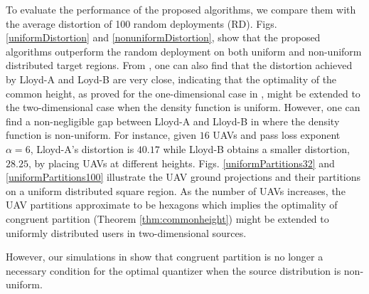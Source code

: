 \documentclass[12pt,onecolumn,final,letterpaper]{IEEEtran}
\newif\ifarxiv\arxivfalse
\begin{document}
To evaluate the performance of the proposed algorithms, we compare them with the average distortion of 100 random
deployments (RD).  Figs. \ref{uniformDistortion} and \ref{nonuniformDistortion}, show that the proposed algorithms
outperform the random deployment on both uniform and non-uniform distributed target regions.  From
, one can also find that the distortion achieved by Lloyd-A and Loyd-B are very close,
indicating that the optimality of the common height, as proved for the one-dimensional case in ,
might be extended to the two-dimensional case when the density function is uniform. However, one can find a non-negligible
gap between Lloyd-A and Lloyd-B in  where the density function is non-uniform. For
instance, given $16$ UAVs and pass loss exponent $\alpha=6$, Lloyd-A's distortion is $40.17$ while Lloyd-B obtains a smaller
distortion, $28.25$, by placing UAVs at different heights.  
%
Figs. \ref{uniformPartitions32} and
\ref{uniformPartitions100} illustrate the UAV ground projections and their partitions on a uniform distributed
square region. As the number of UAVs increases, the UAV partitions approximate to be hexagons which implies the optimality of congruent partition (Theorem \ref{thm:commonheight}) might be extended to uniformly distributed users in two-dimensional sources. 
\ifarxiv However, the UAV projections in Figs. \ref{nonuniformPartitions32} and
\ref{nonuniformPartitions100} show that congruent partition is no longer a necessary condition for the optimal quantizer
when distribution is non-uniform. \else   
However, our
simulations in \cite{GWJ18b} show that congruent partition is no longer a necessary condition for the optimal quantizer
when the source distribution is non-uniform.
\fi
%
\end{document}
